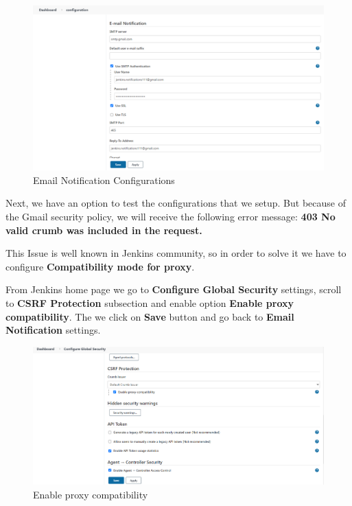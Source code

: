 \documentclass[12pt,a4paper,twoside]{article}
\begin{document}
\begin{figure}[H]
    \centering
        \includegraphics[width=15cm]{images-aws/51-email-settings.png}
        \caption{Email Notification Configurations}
\end{figure}


Next, we have an option to test the configurations that we setup. But because of the Gmail security policy, we will receive the following error message: \textbf{403 No valid crumb was included in the request.}


This Issue is well known in Jenkins community, so in order to solve it we have to configure \textbf{Compatibility mode for proxy}. 


From Jenkins home page we go to \textbf{Configure Global Security} settings, scroll to \textbf{CSRF Protection} subsection and enable option \textbf{Enable proxy compatibility}. The we click on \textbf{Save} button and go back to \textbf{Email Notification} settings.


\begin{figure}[H]
    \centering
        \includegraphics[width=15cm]{images-aws/52-enable-proxy-compatibility.png}
        \caption{Enable proxy compatibility}
\end{figure}
\end{document}
